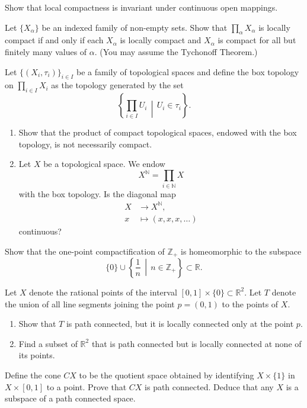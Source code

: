 \documentclass[addpoints,10pt]{exam}
\theoremstyle{plain}
\theoremstyle{definition}
\newtheorem{prob}[thm]{Problem}
\theoremstyle{plain}
\theoremstyle{plain}
\theoremstyle{definition}
\let\oldprob\prob
\let\endoldprob\endprob
\renewenvironment{prob}
  {\begin{singlespace}\oldprob}
  {\endoldprob\end{singlespace}}
\newcommand{\NN}{\ensuremath{\mathbb{N}}}
\newcommand{\RR}{\ensuremath{\mathbb{R}}}
\newcommand{\ZZ}{\ensuremath{\mathbb{Z}}}
\begin{document}
\begin{prob}
Show that local compactness is invariant under continuous open mappings.
\end{prob}

\begin{prob}
Let $\{X_{\alpha}\}$ be an indexed family of non-empty sets. Show that
$\prod_{\alpha}X_{\alpha}$ is locally compact if and only if each
$X_{\alpha}$ is locally compact and $X_{\alpha}$ is compact for all but
finitely many values of $\alpha$. (You may assume the Tychonoff Theorem.)
\end{prob}

\begin{prob}
Let $\{(X_i,\tau_i)\}_{i\in I}$ be a family of topological spaces and define
the box topology on $\prod_{i\in I}X_i$ as the topology generated by the set
\[
\left\{
\prod_{i\in I}U_i \,\middle|\, U_i\in\tau_i
\right\}.
\]

\begin{enumerate}[label=(\alph*)]
    \item Show that the product of compact topological spaces, endowed with
    the box topology, is not necessarily compact.

    \item Let $X$ be a topological space. We endow
    \[
    X^{\NN}=\prod_{i\in\NN}X
    \]
    with the box topology. Is the diagonal map
    \[
    \begin{aligned}
    X&\longrightarrow X^{\NN},\\
    x&\longmapsto(x,x,x,\ldots)
    \end{aligned}
    \]
    continuous?
\end{enumerate}
\end{prob}

\begin{prob}
Show that the one-point compactification of $\ZZ_{+}$ is homeomorphic to the
subspace
\[
\{0\}\cup
\left\{
\frac1n \,\middle|\, n\in\ZZ_{+}
\right\}
\subset\RR.
\]
\end{prob}

\begin{prob}
Let $X$ denote the rational points of the interval
$[0,1]\times\{0\}\subset\RR^2$. Let $T$ denote the union of all line
segments joining the point $p=(0,1)$ to the points of $X$.

\begin{enumerate}[label=(\alph*)]
    \item Show that $T$ is path connected, but it is locally connected only
    at the point $p$.

    \item Find a subset of $\RR^2$ that is path connected but is locally
    connected at none of its points.
\end{enumerate}
\end{prob}

\begin{prob}
Define the cone $CX$ to be the quotient space obtained by identifying
$X\times\{1\}$ in $X\times[0,1]$ to a point. Prove that $CX$ is path
connected. Deduce that any $X$ is a subspace of a path connected space.
\end{prob}
\end{document}

